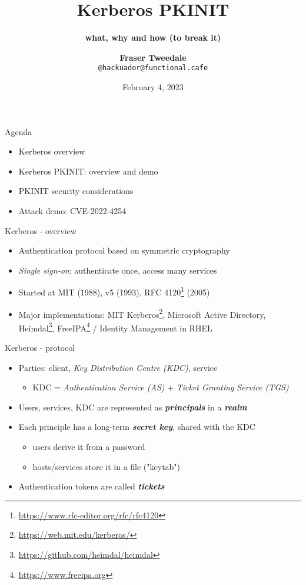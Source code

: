 \documentclass[ignorenonframetext,aspectratio=169,12pt]{beamer}
\title{\bf Kerberos PKINIT}
\subtitle{\bf what, why and how (to break it)}
\author{{\bf Fraser Tweedale}\\
    \texttt{@hackuador@functional.cafe}\\
    \bigskip
    \def\svgwidth{4cm}
    }
\date{February 4, 2023}
\begin{document}
\frame{\titlepage}

\begin{frame}{Agenda}
\protect\hypertarget{agenda}{}

\begin{itemize}
    \item Kerberos overview
    \item Kerberos PKINIT: overview and demo
    \item PKINIT security considerations
    \item Attack demo: CVE-2022-4254
\end{itemize}

\end{frame}


\begin{frame}{Kerberos - overview}
\protect\hypertarget{kerberos-overview}{}
\begin{itemize}
    \item Authentication protocol based on symmetric cryptography
    \item {\em Single sign-on}: authenticate once, access many services
    \item Started at MIT (1988), v5 (1993),
        RFC 4120\footnote{\url{https://www.rfc-editor.org/rfc/rfc4120}} (2005)
    \item Major implementations:
        MIT Kerberos\footnote{\url{https://web.mit.edu/kerberos/}},
        Microsoft Active Directory,
        Heimdal\footnote{\url{https://github.com/heimdal/heimdal}},
        FreeIPA\footnote{\url{https://www.freeipa.org}} / Identity Management in RHEL
\end{itemize}
\end{frame}


\begin{frame}{Kerberos - protocol}
\protect\hypertarget{kerberos-protocol}{}
\begin{itemize}
    \item Parties: client, {\em Key Distribution Centre (KDC)}, service
        \begin{itemize}
            \item KDC = {\em Authentication Service (AS)} +
                {\em Ticket Granting Service (TGS)}
        \end{itemize}
    \item Users, services, KDC are represented as \textbf{\em principals} in a \textbf{\em realm}
    \item Each principle has a long-term \textbf{\em secret key}, shared with the KDC
        \begin{itemize}
            \item users derive it from a password
            \item hosts/services store it in a file ("keytab")
        \end{itemize}
    \item Authentication tokens are called \textbf{\em tickets}
\end{itemize}
\end{frame}
\end{document}
